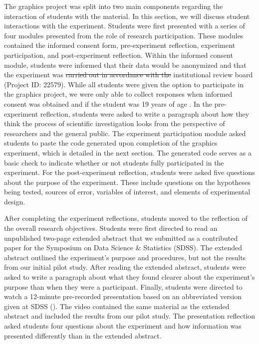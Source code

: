 \documentclass[
  12pt,
]{article}
\providecommand{\DIFadd}[1]{{\protect\color{blue}\uwave{#1}}} %
\providecommand{\DIFdel}[1]{{\protect\color{red}\sout{#1}}}                      %
\providecommand{\DIFaddbegin}{} %
\providecommand{\DIFaddend}{} %
\providecommand{\DIFdelbegin}{} %
\providecommand{\DIFdelend}{} %
\newcommand{\DIFscaledelfig}{0.5}
\newlength{\DIFdelgraphicswidth} %
\newlength{\DIFdelgraphicsheight} %
\newcommand{\DIFaddincludegraphics}[2][]{{\color{blue}\fbox{\DIFOincludegraphics[#1]{#2}}}} %
\newcommand{\DIFdelincludegraphics}[2][]{%
\sbox{\DIFdelgraphicsbox}{\DIFOincludegraphics[#1]{#2}}%
\settoboxwidth{\DIFdelgraphicswidth}{\DIFdelgraphicsbox} %
\settoboxtotalheight{\DIFdelgraphicsheight}{\DIFdelgraphicsbox} %
\scalebox{\DIFscaledelfig}{%
\parbox[b]{\DIFdelgraphicswidth}{\usebox{\DIFdelgraphicsbox}\\[-\baselineskip] \rule{\DIFdelgraphicswidth}{0em}}\llap{\resizebox{\DIFdelgraphicswidth}{\DIFdelgraphicsheight}{%
\setlength{\unitlength}{\DIFdelgraphicswidth}%
\begin{picture}(1,1)%
\thicklines\linethickness{2pt} %
{\color[rgb]{1,0,0}\put(0,0){\framebox(1,1){}}}%
{\color[rgb]{1,0,0}\put(0,0){\line( 1,1){1}}}%
{\color[rgb]{1,0,0}\put(0,1){\line(1,-1){1}}}%
\end{picture}%
}\hspace*{3pt}}} %
} %
\DeclareRobustCommand{\DIFaddbegin}{\DIFOaddbegin \let\includegraphics\DIFaddincludegraphics} %
\DeclareRobustCommand{\DIFaddend}{\DIFOaddend \let\includegraphics\DIFOincludegraphics} %
\DeclareRobustCommand{\DIFdelbegin}{\DIFOdelbegin \let\includegraphics\DIFdelincludegraphics} %
\DeclareRobustCommand{\DIFdelend}{\DIFOaddend \let\includegraphics\DIFOincludegraphics} %
\begin{document}
The graphics project was split into two main components regarding the
interaction of students with the material. In this section, we will
discuss student interactions with the experiment. Students were first
presented with a series of four modules presented from the role of
research participation. These modules contained the informed consent
form, pre-experiment reflection, experiment participation, and
post-experiment reflection. Within the informed consent module, students
were informed that their data would be anonymized and that the
experiment was \DIFdelbegin \DIFdel{carried out in accordance with the }\DIFdelend \DIFaddbegin \DIFadd{exempt from }\DIFaddend institutional review board (Project ID:
22579). While all students were given the option to participate in the
graphics project, we were only able to collect responses when informed
consent was obtained and if the student was 19 years of age \DIFaddbegin \DIFadd{or older}\DIFaddend . In
the pre-experiment reflection, students were asked to write a paragraph
about how they think the process of scientific investigation looks from
the perspective of researchers and the general public. The experiment
participation module asked students to paste the code generated upon
completion of the graphics experiment, which is detailed in the next
section. The generated code serves as a basic check to indicate whether
or not students fully participated in the experiment. For the
post-experiment reflection, students were asked five questions about the
purpose of the experiment. These include questions on the hypotheses
being tested, sources of error, variables of interest, and elements of
experimental design.

After completing the experiment reflections, students moved to the
reflection of the overall research objectives. Students were first
directed to read an unpublished two-page extended abstract that we
submitted as a contributed paper for the Symposium on Data Science \&
Statistics (SDSS). The extended abstract outlined the experiment's
purpose and procedures, but not the results from our initial pilot
study. After reading the extended abstract, students were asked to write
a paragraph about what they found clearer about the experiment's purpose
than when they were a participant. Finally, students were directed to
watch a 12-minute pre-recorded presentation based on an abbreviated
version given at SDSS ().
The video contained the same material as the extended abstract and
included the results from our pilot study. The presentation reflection
asked students four questions about the experiment and how information
was presented differently than in the extended abstract.
\end{document}
